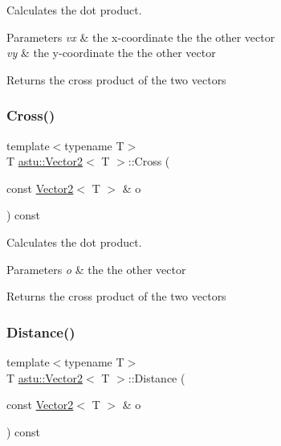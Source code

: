 Calculates the dot product.


\begin{DoxyParams}{Parameters}
{\em vx} & the x-\/coordinate the the other vector \\
\hline
{\em vy} & the y-\/coordinate the the other vector \\
\hline
\end{DoxyParams}
\begin{DoxyReturn}{Returns}
the cross product of the two vectors 
\end{DoxyReturn}
\mbox{\label{classastu_1_1Vector2_ab39f342813a6f5f21a533a4345e1336c}} 
\subsubsection{\texorpdfstring{Cross()}{Cross()}\hspace{0.1cm}{\footnotesize\ttfamily [2/2]}}
{\footnotesize\ttfamily template$<$typename T$>$ \\
T \hyperlink{classastu_1_1Vector2}{astu\+::\+Vector2}$<$ T $>$\+::Cross (\begin{DoxyParamCaption}\item[{const \hyperlink{classastu_1_1Vector2}{Vector2}$<$ T $>$ \&}]{o }\end{DoxyParamCaption}) const\hspace{0.3cm}{\ttfamily [inline]}}

Calculates the dot product.


\begin{DoxyParams}{Parameters}
{\em o} & the the other vector \\
\hline
\end{DoxyParams}
\begin{DoxyReturn}{Returns}
the cross product of the two vectors 
\end{DoxyReturn}
\mbox{\label{classastu_1_1Vector2_a504029e7043988ec1e697b1a1e2cfb78}} 
\subsubsection{\texorpdfstring{Distance()}{Distance()}}
{\footnotesize\ttfamily template$<$typename T$>$ \\
T \hyperlink{classastu_1_1Vector2}{astu\+::\+Vector2}$<$ T $>$\+::Distance (\begin{DoxyParamCaption}\item[{const \hyperlink{classastu_1_1Vector2}{Vector2}$<$ T $>$ \&}]{o }\end{DoxyParamCaption}) const\hspace{0.3cm}{\ttfamily [inline]}}

